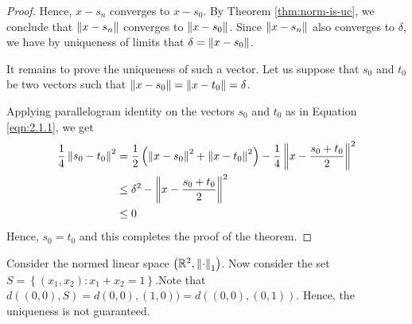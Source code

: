 \begin{proof}
     Hence, $x -s_{n}$ converges to $x- s_{0}$. By Theorem \ref{thm:norm-is-uc}, we conclude that $\left\lVert x-s_{n} \right\rVert$ converges to $\left\lVert x-s_0 \right\rVert$. Since $\left\lVert x-s_{n} \right\rVert$ also converges to $\delta$, we have by uniqueness of limits that $\delta = \left\lVert x-s_{0} \right\rVert$.

     It remains to prove the uniqueness of such a vector. Let us suppose that $s_0$ and $t_0$ be two vectors such that $\left\lVert x-s_{0} \right\rVert = \left\lVert x-t_{0} \right\rVert=\delta$.

     Applying parallelogram identity on the vectors $s_{0}$ and $t_0$ as in Equation \ref{eqn:2.1.1}, we get
\begin{align*}
	 \frac{1}{4} \left\lVert s_0 - t_0 \right\rVert^{2} &= \frac{1}{2} \left( \left\lVert x-s_{0} \right\rVert^{2} + \left\lVert x-t_0 \right\rVert^{2} \right) - \frac{1}{4} \left\lVert x - \frac{s_0 + t_0}{2} \right\rVert^{2} \\
	 & \le \delta^2 -  \left\lVert x - \frac{s_0 + t_0}{2} \right\rVert^{2} \\
	 & \le 0
     \end{align*}
     Hence, $s_0 = t_0$ and this completes the proof of the theorem.
\end{proof}

\begin{example} Consider the normed linear space $\left( \mathbb R ^{2}, \left\lVert \cdot \right\rVert _{1} \right)$. Now consider the set $S= \left\{ \left( x_{1} , x_{2} \right) : x_{1} + x_{2} =1 \right\}$.Note that $d \left( (0,0),S \right)=d\left( 0,0 \right), \left( 1,0 \right)) = d\left( \left( 0,0 \right), \left( 0,1 \right) \right)$. Hence, the uniqueness is not guaranteed.
\end{example}


